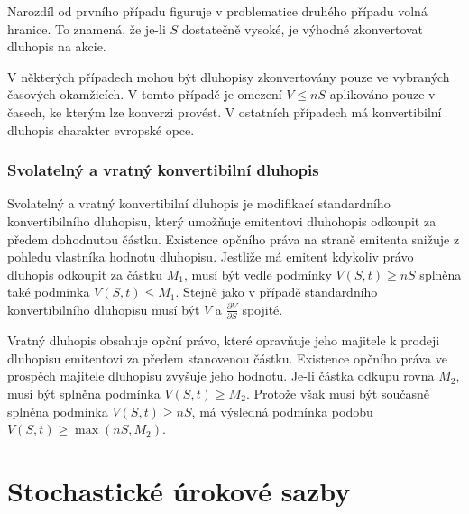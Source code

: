 \documentclass[a4paper]{book}
\begin{document}
Narozdíl od prvního případu figuruje v problematice druhého případu volná hranice. To znamená, že je-li $S$ dostatečně vysoké, je výhodné zkonvertovat dluhopis na akcie.

V některých případech mohou být dluhopisy zkonvertovány pouze ve vybraných časových okamžicích. V tomto případě je omezení $V \le nS$ aplikováno pouze v časech, ke kterým lze konverzi provést. V ostatních případech má konvertibilní dluhopis charakter evropské opce.

\subsubsection{Svolatelný a vratný konvertibilní dluhopis}

Svolatelný a vratný konvertibilní dluhopis je modifikací standardního konvertibilního dluhopisu, který umožňuje emitentovi dluhohopis odkoupit za předem dohodnutou částku. Existence opčního práva na straně emitenta snižuje z pohledu vlastníka hodnotu dluhopisu. Jestliže má emitent kdykoliv právo dluhopis odkoupit za částku $M_1$, musí být vedle podmínky $V(S,t) \ge nS$ splněna také podmínka $V(S,t) \le M_1$. Stejně jako v případě standardního konvertibilního dluhopisu musí být $V$ a $\frac{\partial V}{\partial S}$ spojité.

Vratný dluhopis obsahuje opční právo, které opravňuje jeho majitele k prodeji dluhopisu emitentovi za předem stanovenou částku. Existence opčního práva ve prospěch majitele dluhopisu zvyšuje jeho hodnotu. Je-li částka odkupu rovna $M_2$, musí být splněna podmínka $V(S,t) \ge M_2$. Protože však musí být současně splněna podmínka $V(S,t) \ge nS$, má výsledná podmínka podobu $V(S,t) \ge \max(nS, M_2)$.

\section{Stochastické úrokové sazby}
\end{document}
